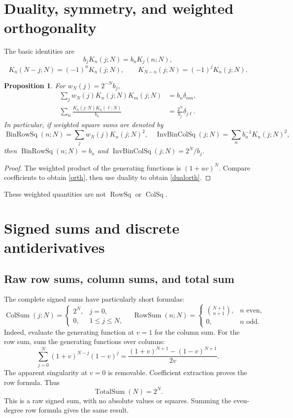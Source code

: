 \documentclass[11pt,reqno]{amsart}
\newtheorem{proposition}[theorem]{Proposition}
\theoremstyle{remark}\newtheorem{remark}[theorem]{Remark}
\DeclareMathOperator{\RowSum}{RowSum}
\DeclareMathOperator{\ColSum}{ColSum}
\DeclareMathOperator{\TotalSum}{TotalSum}
\DeclareMathOperator{\RowSq}{RowSq}
\DeclareMathOperator{\ColSq}{ColSq}
\DeclareMathOperator{\BinRowSq}{BinRowSq}
\DeclareMathOperator{\InvBinColSq}{InvBinColSq}
\begin{document}
\section{Duality, symmetry, and weighted orthogonality}
The basic identities are
\begin{equation}\label{dual}
b_jK_n(j;N)=b_nK_j(n;N),
\end{equation}
\begin{equation}\label{reflections}
K_n(N-j;N)=(-1)^nK_n(j;N),\qquad K_{N-n}(j;N)=(-1)^jK_n(j;N).
\end{equation}
\begin{proposition}\label{orthprop}
For $w_N(j)=2^{-N}b_j$,
\begin{align}
\sum_jw_N(j)K_n(j;N)K_m(j;N)&=b_n\delta_{nm},\label{orth}\\
\sum_n\frac{K_n(j;N)K_n(\ell;N)}{b_n}&=\frac{2^N}{b_j}\delta_{j\ell}.\label{dualorth}
\end{align}
In particular, if weighted square sums are denoted by
\[
\BinRowSq(n;N)=\sum_jw_N(j)K_n(j;N)^2,\quad
\InvBinColSq(j;N)=\sum_n b_n^{-1}K_n(j;N)^2,
\]
then $\BinRowSq(n;N)=b_n$ and $\InvBinColSq(j;N)=2^N/b_j$.
\end{proposition}
\begin{proof}
The weighted product of the generating functions is $(1+uv)^N$. Compare coefficients to obtain \eqref{orth}, then use duality to obtain \eqref{dualorth}.
\end{proof}
These weighted quantities are not $\RowSq$ or $\ColSq$.

\section{Signed sums and discrete antiderivatives}
\subsection{Raw row sums, column sums, and total sum}
The complete signed sums have particularly short formulas:
\begin{equation}\label{signedsums}
\boxed{\ColSum(j;N)=\begin{cases}2^N,&j=0,\\0,&1\le j\le N,\end{cases}
\quad
\RowSum(n;N)=\begin{cases}\binom{N+1}{n+1},&n\text{ even},\\0,&n\text{ odd}.\end{cases}}
\end{equation}
Indeed, evaluate the generating function at $v=1$ for the column sum. For the row sum, sum the generating functions over columns:
\[
\sum_{j=0}^N(1+v)^{N-j}(1-v)^j
=\frac{(1+v)^{N+1}-(1-v)^{N+1}}{2v}.
\]
The apparent singularity at $v=0$ is removable. Coefficient extraction proves the row formula. Thus
\begin{equation}\label{rawtotal}
\boxed{\TotalSum(N)=2^N.}
\end{equation}
This is a raw signed sum, with no absolute values or squares. Summing the even-degree row formula gives the same result.
\end{document}
